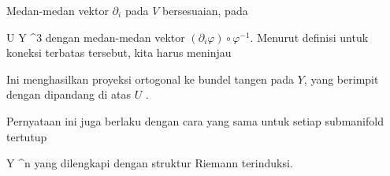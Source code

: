 {Medan-medan vektor $\partial_i$ pada $V$ bersesuaian, pada

\mavergleichskette
{\vergleichskette
{ U
}
{ \subseteq }{ Y
}
{ \subseteq }{ \R^3
}
{    }{
}
{   }{
}
}
{}{}{}
dengan medan-medan vektor $\left(  \partial_i \varphi  \right)  \circ \varphi^{-1}$. Menurut definisi
untuk koneksi terbatas tersebut, kita harus meninjau

 {  }

Ini menghasilkan proyeksi ortogonal
ke bundel tangen pada $Y$, yang berimpit dengan
dipandang di atas $U$
 {} {.}

}

Pernyataan ini juga berlaku dengan cara yang sama untuk setiap submanifold tertutup

\mavergleichskette
{\vergleichskette
{ Y
}
{ \subseteq }{ \R^n
}
{  }{
}
{    }{
}
{   }{
}
}
{}{}{}
yang dilengkapi dengan struktur Riemann terinduksi.
